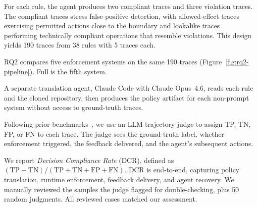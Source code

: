 For each rule, the agent produces two compliant traces and three violation traces.
The compliant traces stress false-positive detection, with allowed-effect traces exercising permitted actions close to the boundary and lookalike traces performing technically compliant operations that resemble violations.
This design yields 190 traces from 38 rules with 5 traces each.


RQ2 compares five enforcement systems on the same 190 traces (Figure~\ref{fig:rq2-pipeline}).
Full \sys{} is the fifth system.

A separate translation agent, Claude Code with Claude Opus~4.6, reads each rule and the cloned repository, then produces the policy artifact for each non-prompt system without access to ground-truth traces.

Following prior benchmarks~\cite{zheng2023judging,debenedetti2024agentdojo,li2025shieldagent,chen2026toolsafe}, we use an LLM trajectory judge to assign TP, TN, FP, or FN to each trace.
The judge sees the ground-truth label, whether enforcement triggered, the feedback delivered, and the agent's subsequent actions.

We report \emph{Decision Compliance Rate} (DCR), defined as $(\mathrm{TP}+\mathrm{TN})/(\mathrm{TP}+\mathrm{TN}+\mathrm{FP}+\mathrm{FN})$.
DCR is end-to-end, capturing policy translation, runtime enforcement, feedback delivery, and agent recovery.
We manually reviewed the samples the judge flagged for double-checking, plus 50 random judgments. All reviewed cases matched our assessment.

